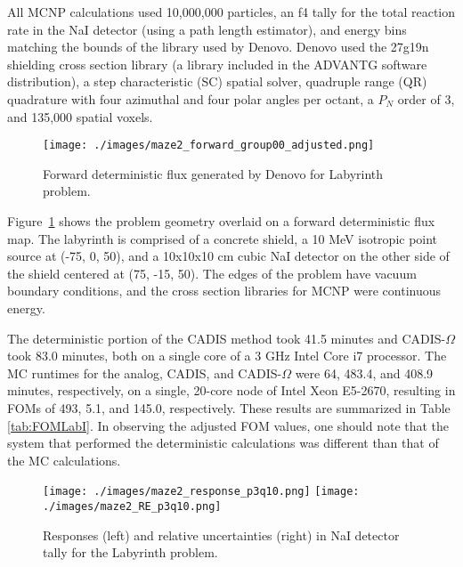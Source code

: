 \documentclass[12pt]{article}
\begin{document}
All MCNP calculations used 10,000,000 particles, an f4 tally for the total reaction rate in the NaI detector (using a path length estimator), and energy bins matching the bounds of the library used by Denovo. 
Denovo used the 27g19n shielding cross section library (a library included in the ADVANTG software distribution), a step characteristic (SC) spatial solver, quadruple range (QR) quadrature with four azimuthal and four polar angles per octant, a $P_N$ order of 3, and 135,000 spatial voxels.

\begin{figure}
  \begin{center}
    \texttt{[image: ./images/maze2\_forward\_group00\_adjusted.png]}
    \caption[]{\label{fig::fwdflux}Forward deterministic flux generated by Denovo for Labyrinth problem.}
  \end{center}
\end{figure}
Figure~\ref{fig::fwdflux} shows the problem geometry overlaid on a forward deterministic flux map. The labyrinth is comprised of a concrete shield, a 10 MeV isotropic point source at (-75, 0, 50), and a 10x10x10 cm cubic NaI detector on the other side of the shield centered at (75, -15, 50). The edges of the problem have vacuum boundary conditions, and the cross section libraries for MCNP were continuous energy. 

The deterministic portion of the CADIS method took 41.5 minutes and CADIS-$\Omega$ took 83.0 minutes, both on a single core of a 3 GHz Intel Core i7 processor. The MC runtimes for the analog, CADIS, and CADIS-$\Omega$ were 64, 483.4, and 408.9 minutes, respectively, on a single, 20-core node of Intel Xeon E5-2670, resulting in FOMs of 493, 5.1, and 145.0, respectively. These results are summarized in Table \ref{tab:FOMLabI}. In observing the adjusted FOM values, one should note that the system that performed the deterministic calculations was different than that of the MC calculations. 

\begin{figure}
  \begin{center}
    \texttt{[image: ./images/maze2\_response\_p3q10.png]}
    \texttt{[image: ./images/maze2\_RE\_p3q10.png]}
    \caption[]{\label{fig::tallyresponse} Responses (left) and relative uncertainties (right) in NaI detector tally for the Labyrinth problem. }
  \end{center}
\end{figure}
\end{document}
